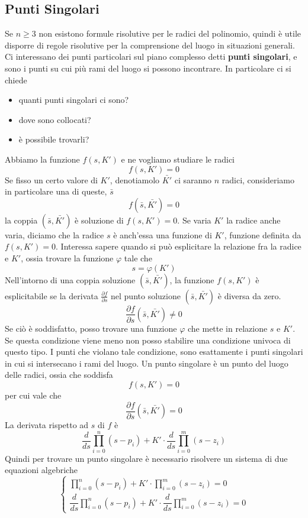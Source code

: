 \documentclass[10pt, letterpaper]{report}
\begin{document}
\subsection{Punti Singolari}
Se $n\ge 3$ non esistono formule risolutive per le radici del polinomio, quindi è utile disporre di regole risolutive per la comprensione del luogo in situazioni generali. Ci interessano dei punti particolari sul piano complesso detti \textbf{punti singolari}, e sono i punti su cui più rami del luogo si possono incontrare. In particolare ci si chiede\begin{itemize}
    \item quanti punti singolari ci sono?
    \item dove sono collocati?
    \item è possibile trovarli?
\end{itemize}
Abbiamo la funzione $f(s,K')$ e ne vogliamo studiare le radici 
$$ f(s,K')=0$$
Se fisso un certo valore di $K'$, denotiamolo $\bar{K'}$ ci saranno $n$ radici, consideriamo in particolare una di queste, $\bar s$ 
$$ f(\bar s,\bar{K'})=0$$ 
la coppia $(\bar s,\bar{K'})$ è soluzione di $ f(s,K')=0$. Se varia $K'$ la radice anche varia, diciamo che la radice $s$ è anch'essa una funzione di $K'$, funzione definita  da $ f(s,K')=0$. Interessa sapere quando si può esplicitare la relazione fra la radice e $K'$, ossia trovare la funzione $\varphi$ tale che $$ s=\varphi(K')$$
 Nell'intorno di una coppia soluzione $(\bar s,\bar{K'})$, la funzione $f(s,K')$ è esplicitabile se la derivata $\displaystyle \frac{\partial f}{\partial s}$ nel punto soluzione $(\bar s,\bar{K'})$ è diversa da zero.$$\frac{\partial f}{\partial s} (\bar s,\bar{K'})\ne 0$$
Se ciò è soddisfatto, posso trovare una funzione $\varphi$ che mette in relazione $s$ e $K'$. Se questa condizione viene meno non posso stabilire una condizione univoca di questo tipo. I punti che violano tale condizione, sono esattamente i punti  singolari in cui si intersecano i rami del luogo.\acc
{} Un punto singolare è un punto del luogo delle radici, ossia che soddisfa 
$$ f(s,K')=0$$
per cui vale che 
$$\frac{\partial f}{\partial s} (\bar s,\bar{K'}) = 0$$
La derivata rispetto ad $s$ di $f$ è 
$$\frac{d}{ds}\displaystyle\prod_{i=0}^n(s-p_i)+K'\cdot \frac{d}{ds}\displaystyle\prod_{i=0}^m(s-z_i) $$
Quindi per trovare un punto singolare è necessario risolvere un sistema di due equazioni algebriche 
$$\begin{cases}
    \displaystyle\prod_{i=0}^n(s-p_i)+K'\cdot\displaystyle\prod_{i=0}^m(s-z_i)=0\\
    \dfrac{d}{ds}\displaystyle\prod_{i=0}^n(s-p_i)+K'\cdot \dfrac{d}{ds}\displaystyle\prod_{i=0}^m(s-z_i)=0
\end{cases}$$
\end{document}
